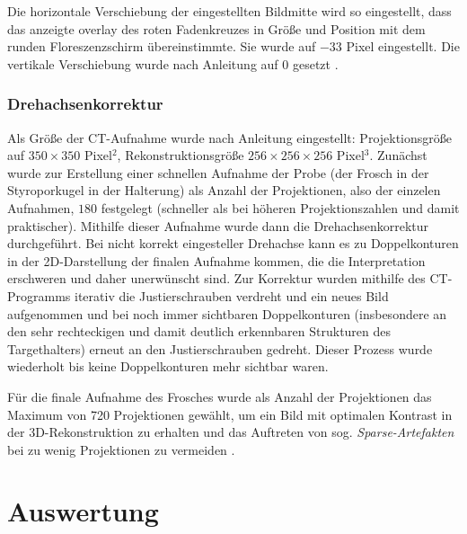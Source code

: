Die horizontale Verschiebung der eingestellten Bildmitte wird so eingestellt, dass das anzeigte overlay des roten Fadenkreuzes in Größe und Position mit dem runden Floreszenzschirm übereinstimmte. Sie wurde auf $-33$ Pixel eingestellt. Die vertikale Verschiebung wurde nach Anleitung auf 0 gesetzt \cite[3]{LDctmodul}.

\subsubsection*{Drehachsenkorrektur}

Als Größe der CT-Aufnahme wurde nach Anleitung eingestellt: Projektionsgröße auf $350\times350$ Pixel$^2$, Rekonstruktionsgröße $256\times256\times256$ Pixel$^3$. Zunächst wurde zur Erstellung einer schnellen Aufnahme der Probe (der Frosch in der Styroporkugel in der Halterung) als Anzahl der Projektionen, also der einzelen Aufnahmen, $180$ festgelegt (schneller als bei höheren Projektionszahlen und damit praktischer). Mithilfe dieser Aufnahme wurde dann die Drehachsenkorrektur durchgeführt. Bei nicht korrekt eingesteller Drehachse kann es zu Doppelkonturen in der 2D-Darstellung der finalen Aufnahme kommen, die die Interpretation erschweren und daher unerwünscht sind. Zur Korrektur wurden mithilfe des CT-Programms iterativ die Justierschrauben verdreht und ein neues Bild aufgenommen und bei noch immer sichtbaren Doppelkonturen (insbesondere an den sehr rechteckigen und damit deutlich erkennbaren Strukturen des Targethalters) erneut an den Justierschrauben gedreht. Dieser Prozess wurde wiederholt bis keine Doppelkonturen mehr sichtbar waren.

Für die finale Aufnahme des Frosches wurde als Anzahl der Projektionen das Maximum von 720 Projektionen gewählt, um ein Bild mit optimalen Kontrast in der 3D-Rekonstruktion zu erhalten und das Auftreten von sog. \textit{Sparse-Artefakten} bei zu wenig Projektionen zu vermeiden \cite[169]{medizinphysik}.


\section{Auswertung}

